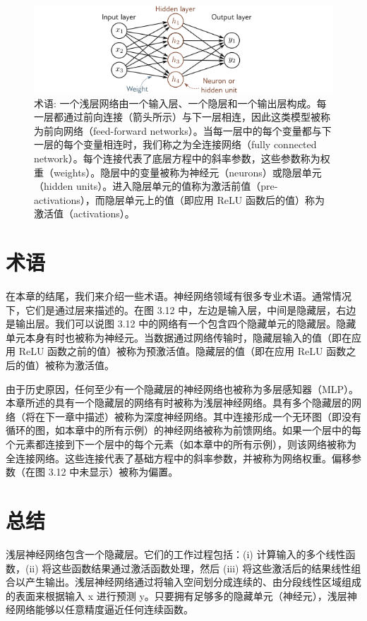 \begin{figure}[ht!]
	\centering
	\includegraphics[width=0.7\linewidth]{png/chapter3/ShallowTerminology.png}
\caption{术语: 一个浅层网络由一个输入层、一个隐层和一个输出层构成。每一层都通过前向连接（箭头所示）与下一层相连，因此这类模型被称为前向网络（feed-forward networks）。当每一层中的每个变量都与下一层的每个变量相连时，我们称之为全连接网络（fully connected network）。每个连接代表了底层方程中的斜率参数，这些参数称为权重（weights）。隐层中的变量被称为神经元（neurons）或隐层单元（hidden units）。进入隐层单元的值称为激活前值（pre-activations），而隐层单元上的值（即应用 ReLU 函数后的值）称为激活值（activations）。}
\end{figure}

\section{术语}
在本章的结尾，我们来介绍一些术语。神经网络领域有很多专业术语。通常情况下，它们是通过层来描述的。在图 3.12 中，左边是输入层，中间是隐藏层，右边是输出层。我们可以说图 3.12 中的网络有一个包含四个隐藏单元的隐藏层。隐藏单元本身有时也被称为神经元。当数据通过网络传输时，隐藏层输入的值（即在应用 ReLU 函数之前的值）被称为预激活值。隐藏层的值（即在应用 ReLU 函数之后的值）被称为激活值。

由于历史原因，任何至少有一个隐藏层的神经网络也被称为多层感知器（MLP）。本章所述的具有一个隐藏层的网络有时被称为浅层神经网络。具有多个隐藏层的网络（将在下一章中描述）被称为深度神经网络。其中连接形成一个无环图（即没有循环的图，如本章中的所有示例）的神经网络被称为前馈网络。如果一个层中的每个元素都连接到下一个层中的每个元素（如本章中的所有示例），则该网络被称为全连接网络。这些连接代表了基础方程中的斜率参数，并被称为网络权重。偏移参数（在图 3.12 中未显示）被称为偏置。

\section{总结}
浅层神经网络包含一个隐藏层。它们的工作过程包括：(i) 计算输入的多个线性函数，(ii) 将这些函数结果通过激活函数处理，然后 (iii) 将这些激活后的结果线性组合以产生输出。浅层神经网络通过将输入空间划分成连续的、由分段线性区域组成的表面来根据输入 x 进行预测 y。只要拥有足够多的隐藏单元（神经元），浅层神经网络能够以任意精度逼近任何连续函数。

